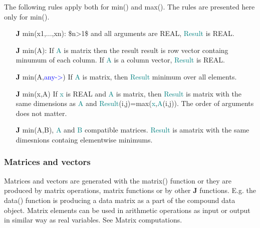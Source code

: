 The following rules apply both for \textcolor{VioletRed}{min}() and \textcolor{VioletRed}{max}(). The rules are presented here only for \textcolor{VioletRed}{min}().
\begin{itemize}
\item[\textbf{J}] \textcolor{VioletRed}{min}(x1,...,xn): \$n>1\$ and all arguments are REAL, \textcolor{teal}{Result} is REAL.
\item[\textbf{J}] \textcolor{VioletRed}{min}(A): If \textcolor{teal}{A} is matrix then the result result is row vector containg minumum
of each column. If \textcolor{teal}{A} is a column vector, \textcolor{teal}{Result} is REAL.
\item[\textbf{J}] \textcolor{VioletRed}{min}(A,\textcolor{blue}{any->}) If \textcolor{teal}{A} is matrix, then \textcolor{teal}{Result} minimum over all elements.
\item[\textbf{J}] \textcolor{VioletRed}{min}(x,A) If \textcolor{teal}{x} is REAL and \textcolor{teal}{A} is matrix, then \textcolor{teal}{Result} is
matrix with the same dimensions as \textcolor{teal}{A} and
\textcolor{teal}{Result}(i,j)=\textcolor{VioletRed}{max}(\textcolor{teal}{x},\textcolor{teal}{A}(i,j)). The order of arguments does not matter.
\item[\textbf{J}] \textcolor{VioletRed}{min}(A,B), \textcolor{teal}{A} and \textcolor{teal}{B} compatible matrices. \textcolor{teal}{Result} is amatrix with the same dimesnions containg elementwise
minimums.
\end{itemize}
\subsubsection{Matrices and vectors}
\label{matrixo}
Matrices and vectors are generated with the \textcolor{VioletRed}{matrix}() function or they are
produced by matrix operations, matrix functions or by other \textbf{J} functions. E.g.
the \textcolor{VioletRed}{data}() function is producing a data matrix as a part of the compound data
object. Matrix elements can be used in arithmetic operations as input or output
in similar way as real variables.
See Matrix computations.
